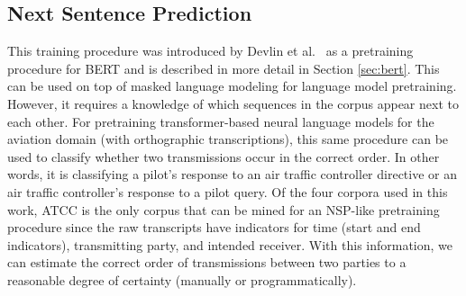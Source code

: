 \documentclass[12pt]{article}
\begin{document}
\subsection{Next Sentence Prediction}
This training procedure was introduced by Devlin et al.~\cite{devlin_bert_2019} as a pretraining procedure for BERT and is described in more detail in
Section \ref{sec:bert}. This can be used on top of masked language modeling for language model pretraining. However, it requires a knowledge of which
sequences in the corpus appear next to each other. For pretraining transformer-based neural language models for the aviation domain (with orthographic
transcriptions), this same procedure can be used to classify whether two transmissions occur in the correct order. In other words, it is classifying a
pilot's response to an air traffic controller directive or an air traffic controller's response to a pilot query. Of the four corpora used in this
work, ATCC is the only corpus that can be mined for an NSP-like pretraining procedure since the raw transcripts have indicators for time (start and
end indicators), transmitting party, and intended receiver. With this information, we can estimate the correct order of transmissions between two
parties to a reasonable degree of certainty (manually or programmatically).
\end{document}
